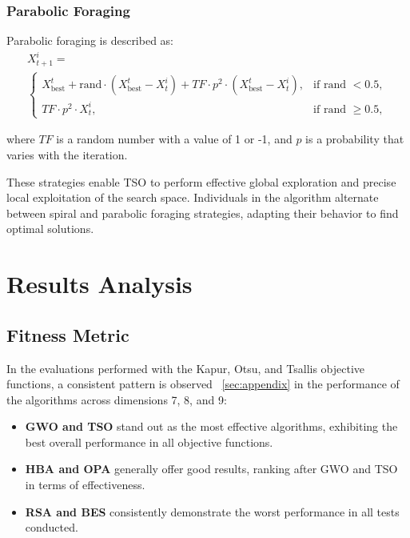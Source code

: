 \documentclass{elsarticle}
\begin{document}
\subsubsection{Parabolic Foraging}
Parabolic foraging is described as:
\begin{equation}
    \begin{gathered}
        X_{t+1}^i = \\
        \begin{cases}
            X_{\text{best}}^t + \text{rand} \cdot (X_{\text{best}}^t - X_t^i) + TF \cdot p^2 \cdot (X_{\text{best}}^t - X_t^i), & \text{if rand } < 0.5,\\
            TF \cdot p^2 \cdot X_t^i, & \text{if rand } \geq 0.5,
        \end{cases}
    \end{gathered}
\end{equation}

\noindent where $TF$ is a random number with a value of 1 or -1, and $p$ is a probability that varies with the iteration.

\noindent These strategies enable TSO to perform effective global exploration and precise local exploitation of the search space. Individuals in the algorithm alternate between spiral and parabolic foraging strategies, adapting their behavior to find optimal solutions.

\section{Results Analysis}

\subsection{Fitness Metric}

\noindent In the evaluations performed with the Kapur, Otsu, and Tsallis objective functions, a consistent pattern is observed ~\ref{sec:appendix} in the performance of the algorithms across dimensions 7, 8, and 9:

\begin{itemize}
    \item \textbf{GWO and TSO} stand out as the most effective algorithms, exhibiting the best overall performance in all objective functions.
    \item \textbf{HBA and OPA} generally offer good results, ranking after GWO and TSO in terms of effectiveness.
    \item \textbf{RSA and BES} consistently demonstrate the worst performance in all tests conducted.
\end{itemize}
\end{document}

